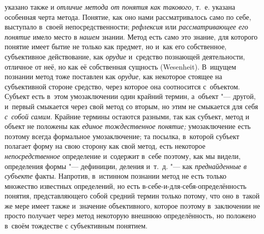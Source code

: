 указано также и {\em отличие метода от понятия как
такового,} т.~е. указана особенная черта метода. Понятие,
как оно нами рассматривалось само по себе, выступало в~своей
непосредственности; {\em рефлексия} или {\em рассматривающее
его понятие} имело место в {\em нашем} знании. Метод
есть само это знание, для которого понятие имеет бытие не только как
предмет, но и~как его собственное, субъективное действование, как
{\em орудие} и~средство
познающей деятельности, отличное от неё, но как её собственная сущность
(Wesenheit). В~ищущем познании метод тоже поставлен как {\em орудие,} как
некоторое стоящее на субъективной стороне средство, через которое она
соотносится с~объектом. Субъект есть в~этом умозаключении один крайний
термин, а~объект "--- другой, и~первый смыкается через свой
метод со вторым, но этим не смыкается для себя {\em с~собой самим}.
Крайние термины остаются разными, так как субъект, метод и
объект не положены как {\em единое
тождественное понятие;} умозаключение есть поэтому всегда
формальное умозаключение; та посылка, в~которой субъект полагает форму на
свою сторону как свой метод, есть некоторое {\em непосредственное}
определение и~содержит в~себе поэтому, как мы видели, определения
формы "--- дефиниции, деления и~т.~д. "--- как {\em преднайденные в
субъекте} факты. Напротив, в~истинном познании метод не есть
только множество известных определений, но есть
в-себе-и-для-себя-определённость понятия, представляющего собой средний
термин только потому, что оно в~такой же мере имеет также и~значение
объективного, которое поэтому в~заключении не просто получает через метод
некоторую внешнюю определённость, но положено в~своём тождестве с
субъективным понятием.

